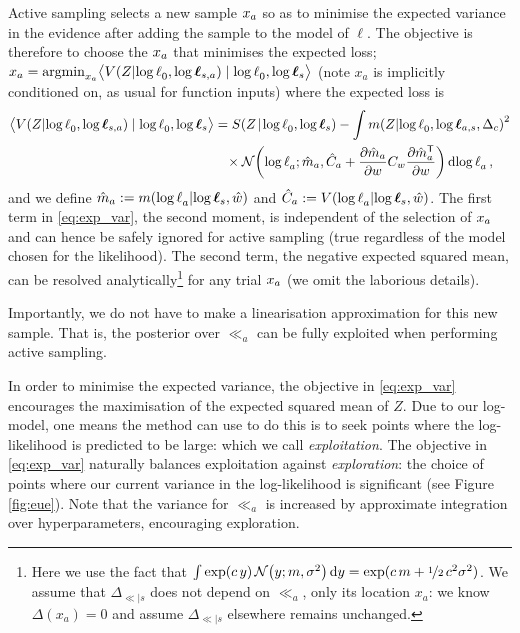 \documentclass{article} %
\newcommand{\De}{\Delta_{\ll|s}}
\begin{document}
Active sampling selects a new sample $\lfv_a$ so as to minimise the expected variance in the evidence after adding the sample to the model of $\ell$.  The objective is therefore to choose the $\lfv_a$ that minimises the expected loss;
$\lfv_a = \argmin_{\lfv_a} \bigl\langle \cov{\If}{\ll_0,\tvr_{s,a}}\mid \ll_0,\tvr_{s}\bigr\rangle 
$
(note $x_a$ is implicitly conditioned on, as usual for function inputs) where the expected loss is
\begin{align}
\bigl\langle \cov{\If}{\ll_0,\tvr_{s,a}}\mid \ll_0,\tvr_{s}\bigr\rangle 
 & = \secm{\If}{\ll_0,\tvr_s} 
 - \int\mean{\If}{\ll_0,\tvr_{a,s},\Delta_c}^2\nonumber\\
& \hspace{0.3cm}
\times\N{\ll_a}
{\hat{m}_a }
{\hat{C}_a +\pderiv{\hat{m}_a}{w}C_w\pderiv{\hat{m}\tra_a}{w}}
\ud\ll_a\,,\label{eq:exp_var}
\end{align}
and we define
$\hat{m}_a \deq \mean{\ll_a}{\tvr_s,\hat{w}}$
and
$\hat{C}_a \deq \cov{\ll_a}{\tvr_s,\hat{w}}$.
The first term in \eqref{eq:exp_var}, the second moment, is independent of the selection of $\lfv_a$ and can hence  be safely ignored for active sampling (true regardless of the model chosen for the likelihood). 
The second term, the negative expected squared mean, can be resolved analytically\footnote{Here we use the fact that $\int \exp(c\, y)\, \N{y}{m}{\sigma^2} \ud y = \exp(c\, m + \nicefrac{1}{2}\, c^2 \sigma^2)$.  We assume that $\De$ does not depend on $\ll_a$, only its location $x_a$: we know $\Delta(x_a) = 0$ and assume $\De$ elsewhere remains unchanged.}
 for any trial $\lfv_a$ (we omit the laborious details). 

Importantly, we do not have to make a linearisation approximation for this new sample. That is, the \gpb  posterior over $\ll_a$ can be fully exploited when performing active sampling.
%

In order to minimise the expected variance, the objective in \eqref{eq:exp_var} encourages the maximisation of the expected squared mean of $Z$. Due to our log-\gpb model, one means the method can use to do this is to seek points where the log-likelihood is predicted to be large: which we call \emph{exploitation}.  The objective in \eqref{eq:exp_var} naturally balances exploitation against \emph{exploration}: the choice of points where our current variance in the log-likelihood is significant (see Figure \ref{fig:eue}). Note that the variance for $\ll_a$ is increased by approximate integration over hyperparameters, encouraging exploration.
\end{document}
